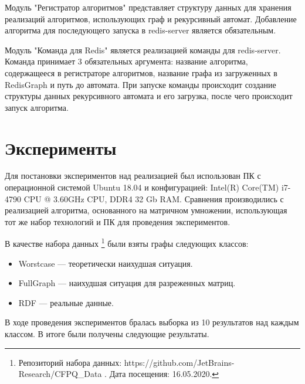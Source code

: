 \documentclass[14pt]{matmex-diploma}
\theoremstyle{definition}
\begin{document}
Модуль "Регистратор алгоритмов" представляет структуру данных для хранения реализаций алгоритмов, использующих граф и рекурсивный автомат. Добавление алгоритма для последующего запуска в redis-server является обязательным.

Модуль "Команда для Redis" является реализацией команды для redis-server. Команда принимает 3 обязательных аргумента: название алгоритма, содержащееся в регистраторе алгоритмов, название графа из загруженных в RedisGraph и путь до автомата. При запуске команды происходит создание структуры данных рекурсивного автомата и его загрузка, после чего происходит запуск алгоритма.


\section{Эксперименты}

Для постановки экспериментов над реализацией был использован ПК с операционной системой Ubuntu 18.04 и конфигурацией: Intel(R) Core(TM) i7-4790 CPU @ 3.60GHz CPU, DDR4 32 Gb RAM. Сравнения производились с реализацией алгоритма, основанного на матричном умножении, использующая тот же набор технологий и ПК для проведения экспериментов. 

В качестве набора данных \footnote{Репозиторий набора данных: https://github.com/JetBrains-Research/CFPQ\_Data . Дата посещения: 16.05.2020.} были взяты графы следующих классов:
\begin{itemize}
    \item Worstcase --- теоретически наихудшая ситуация.
    \item FullGraph --- наихудшая ситуация для разреженных матриц.
    \item RDF --- реальные данные.
\end{itemize}

В ходе проведения экспериментов бралась выборка из 10 результатов над каждым классом. В итоге были получены следующие результаты.
\end{document}

